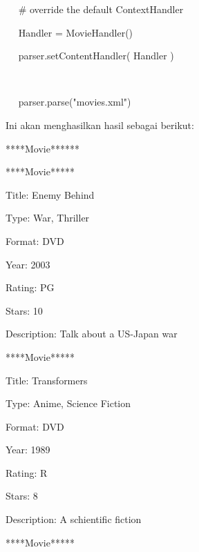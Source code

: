 \documentclass{wileySix}
\begin{document}
\begin{myEnumerate}
\begin{myEnumerate}
	\noindent 
	~~  $  \#  $ override the default ContextHandler \par
	\noindent 
	~~ Handler = MovieHandler() \par
	\noindent 
	~~ parser.setContentHandler( Handler ) \par
	\noindent 
	~~  \par
	\noindent 
	~~ parser.parse("movies.xml") \par
	\vspace{12pt}
	\vspace{12pt}
	\noindent 
	Ini akan menghasilkan hasil sebagai berikut: \par
	\noindent 
	{\fontsize{10pt}{10pt}\selectfont *****Movie******} \par
	\noindent 
	{\fontsize{10pt}{10pt}\selectfont *****Movie*****} \par
	\noindent 
	{\fontsize{10pt}{10pt}\selectfont Title: Enemy Behind} \par
	\noindent 
	{\fontsize{10pt}{10pt}\selectfont Type: War, Thriller} \par
	\noindent 
	{\fontsize{10pt}{10pt}\selectfont Format: DVD} \par
	\noindent 
	{\fontsize{10pt}{10pt}\selectfont Year: 2003} \par
	\noindent 
	{\fontsize{10pt}{10pt}\selectfont Rating: PG} \par
	\noindent 
	{\fontsize{10pt}{10pt}\selectfont Stars: 10} \par
	\noindent 
	{\fontsize{10pt}{10pt}\selectfont Description: Talk about a US-Japan war} \par
	\noindent 
	{\fontsize{10pt}{10pt}\selectfont *****Movie*****} \par
	\noindent 
	{\fontsize{10pt}{10pt}\selectfont Title: Transformers} \par
	\noindent 
	{\fontsize{10pt}{10pt}\selectfont Type: Anime, Science Fiction} \par
	\noindent 
	{\fontsize{10pt}{10pt}\selectfont Format: DVD} \par
	\noindent 
	{\fontsize{10pt}{10pt}\selectfont Year: 1989} \par
	\noindent 
	{\fontsize{10pt}{10pt}\selectfont Rating: R} \par
	\noindent 
	{\fontsize{10pt}{10pt}\selectfont Stars: 8} \par
	\noindent 
	{\fontsize{10pt}{10pt}\selectfont Description: A schientific fiction} \par
	\noindent 
	{\fontsize{10pt}{10pt}\selectfont *****Movie*****} \par

\end{myEnumerate}
\end{myEnumerate}
\end{document}
